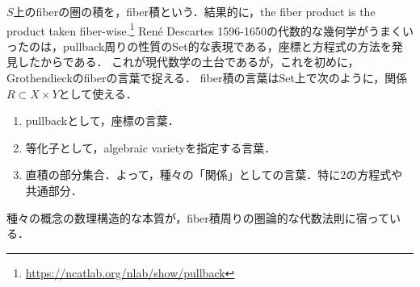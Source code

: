\documentclass[uplatex,dvipdfmx]{jsreport}
\begin{document}
\begin{tcolorbox}[colframe=ForestGreen, colback=ForestGreen!10!white, breakable ,colbacktitle=ForestGreen!40!white, coltitle=black,fonttitle=\bfseries\sffamily,
    title=fiber積とは，「関係」の概念の圏論化である]
    $S$上のfiberの圏の積を，fiber積という．結果的に，the fiber product is the product taken fiber-wise.\footnote{\url{https://ncatlab.org/nlab/show/pullback}}
    René Descartes 1596-1650の代数的な幾何学がうまくいったのは，pullback周りの性質のSet的な表現である，座標と方程式の方法を発見したからである．
    これが現代数学の土台であるが，これを初めに，Grothendieckのfiberの言葉で捉える．
    fiber積の言葉はSet上で次のように，関係$R\subset X\times Y$として使える．
    \begin{enumerate}
        \item pullbackとして，座標の言葉．
        \item 等化子として，algebraic varietyを指定する言葉．
        \item 直積の部分集合．よって，種々の「関係」としての言葉．特に2の方程式や共通部分．
    \end{enumerate}
    種々の概念の数理構造的な本質が，fiber積周りの圏論的な代数法則に宿っている．
\end{tcolorbox}
\end{document}

